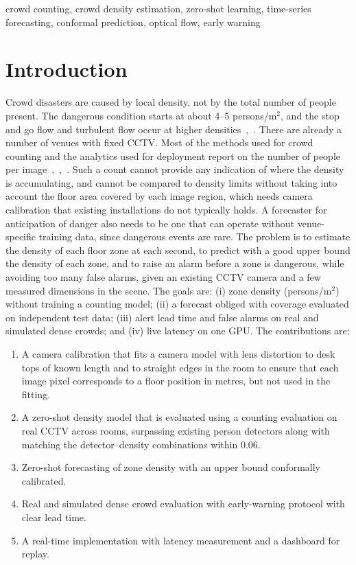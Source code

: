 \documentclass[conference]{IEEEtran}
\begin{document}
\begin{IEEEkeywords}
crowd counting, crowd density estimation, zero-shot learning, time-series forecasting, conformal prediction, optical flow, early warning
\end{IEEEkeywords}

\section{Introduction}
Crowd disasters are caused by local density, not by the total number of people present. The dangerous condition starts at about 4--5 persons/m$^{2}$, and the stop and go flow and turbulent flow occur at higher densities~\cite{fruin1971},~\cite{helbing2007}. There are already a number of venues with fixed CCTV. Most of the methods used for crowd counting and the analytics used for deployment report on the number of people per image~\cite{zhang2016mcnn},~\cite{li2018csrnet},~\cite{ma2025clipebc}. Such a count cannot provide any indication of where the density is accumulating, and cannot be compared to density limits without taking into account the floor area covered by each image region, which needs camera calibration that existing installations do not typically holds. A forecaster for anticipation of danger also needs to be one that can operate without venue-specific training data, since dangerous events are rare. The problem is to estimate the density of each floor zone at each second, to predict with a good upper bound the density of each zone, and to raise an alarm before a zone is dangerous, while avoiding too many false alarms, given an existing CCTV camera and a few measured dimensions in the scene. The goals are: (i) zone density (persons/m$^{2}$) without training a counting model; (ii) a forecast obliged with coverage evaluated on independent test data; (iii) alert lead time and false alarms on real and simulated dense crowds; and (iv) live latency on one GPU. The contributions are:

\begin{enumerate}
\item A camera calibration that fits a camera model with lens distortion to desk tops of known length and to straight edges in the room to ensure that each image pixel corresponds to a floor position in metres, but not used in the fitting.
\item A zero-shot density model that is evaluated using a counting evaluation on real CCTV across rooms, surpassing existing person detectors along with matching the detector--density combinations within 0.06.
\item Zero-shot forecasting of zone density with an upper bound conformally calibrated.
\item Real and simulated dense crowd evaluation with early-warning protocol with clear lead time.
\item A real-time implementation with latency measurement and a dashboard for replay.
\end{enumerate}
\end{document}
